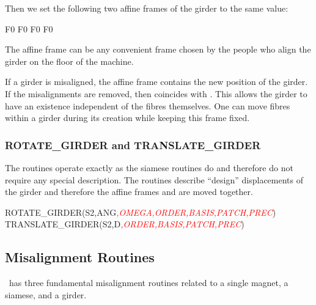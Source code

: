 Then we set the following two affine frames of the girder to the same
value:

\begin{ptccode}
F0%
F0%
F0%
F0%
\end{ptccode}

The affine frame  can be any convenient frame chosen by the
people who align the girder on the floor of the machine.

If a girder is misaligned, the affine frame  contains
the new position of the girder. If the misalignments are removed,
then  coincides with . This allows the girder to have
an existence independent of the fibres themselves. One can move fibres
within a girder during its creation while keeping this frame fixed.


\subsubsection*{ROTATE\_GIRDER and TRANSLATE\_GIRDER}

%
The routines operate exactly as the siamese routines do and therefore
do not require any special description. The routines describe ``design''
displacements of the girder and therefore the affine frames 
and  are moved together.

\begin{ptccode}
ROTATE_GIRDER(S2,ANG\textit{\textcolor{red}{,OMEGA,ORDER,BASIS,PATCH,PREC}})
TRANSLATE_GIRDER(S2,D\textit{\textcolor{red}{,ORDER,BASIS,PATCH,PREC}})
\end{ptccode}


\subsection{Misalignment Routines}

%
\PTC\ has three fundamental misalignment routines related to a single
magnet, a siamese, and a girder.

